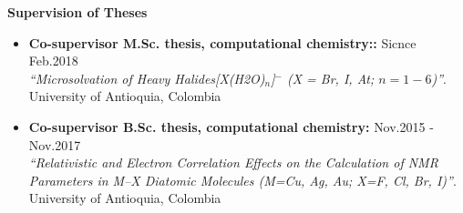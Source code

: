 {\bf\Large Supervision \textcolor{my_blue}{of Theses}}\\ \vspace*{-6mm}

\begin{itemize}
    \item {\bf Co-supervisor M.Sc. thesis, computational chemistry::}\hfill
          \textcolor{my_blue}{Sicnce Feb.2018}\\
          \emph{``Microsolvation of Heavy Halides[X(H2O)$_n$]$^-$ (X = Br,
              I, At; $n=1-6$)''}. \\
          University of Antioquia, Colombia

    \item {\bf Co-supervisor B.Sc. thesis, computational chemistry:}\hfill
          \textcolor{my_blue}{Nov.2015 - Nov.2017}\\
          \emph{``Relativistic and Electron Correlation Effects on the
              Calculation of NMR Parameters in M--X Diatomic Molecules (M=Cu, Ag, Au; X=F,
              Cl, Br, I)''}.\\
          University of Antioquia, Colombia
\end{itemize}